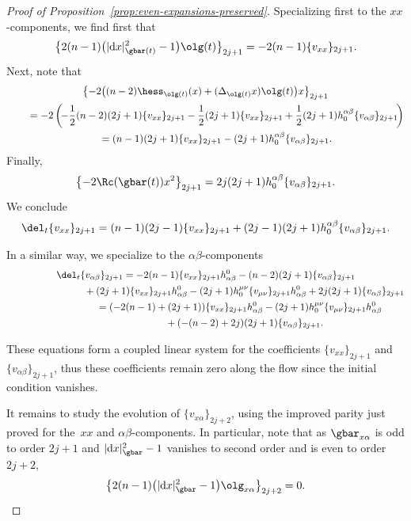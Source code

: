 \begin{proof}[Proof of Proposition~\ref{prop:even-expansions-preserved}]
Specializing first to the $xx$-components, we find first that
\[ \big\{ 2 (n-1) \big(|{\rm d}x|^2_{\gbar(t)} -1\big) \olg(t)\big\}_{2j+1} = -2(n-1) \{v_{xx}\}_{2j+1}. \]
Next, note that
\begin{gather*}
 \big\{ {-}2 \big( (n-2) \hess_{\olg(t)} (x) + (\Delta_{\olg(t)} x) \olg(t) \big) x\big\}_{2j+1} \\
\qquad{} = - 2\left(\!- \frac{1}{2} (n-2)(2j+1) \{ v_{xx} \}_{2j+1} - \frac{1}{2} (2j+1) \{ v_{xx} \}_{2j+1} + \frac{1}{2} (2j+1) h^{\alpha \beta}_0 \{v_{\alpha \beta}\}_{2j+1} \!\right) \\
 \qquad{} = (n-1) (2j+1) \{ v_{xx} \}_{2j+1} - (2j+1) h^{\alpha \beta}_0 \{v_{\alpha \beta}\}_{2j+1}.
\end{gather*}
Finally,
\begin{gather*}
\big\{ {-}2 \Rc(\gbar(t)) x^2 \big\}_{2j+1} = 2j( 2j+1) h^{\alpha \beta}_0 \{v_{\alpha \beta}\}_{2j+1}.
\end{gather*}
We conclude
\begin{gather*}
\del_t \{ v_{xx} \}_{2j+1} = (n-1)(2j-1) \{v_{xx}\}_{2j+1} + (2j-1)(2j+1) h^{\alpha \beta}_0 \{v_{\alpha \beta}\}_{2j+1}.
\end{gather*}

In a similar way, we specialize to the $\alpha \beta$-components
\begin{gather*}
 \del_t \{ v_{\alpha \beta} \}_{2j+1} = -2(n-1) \{v_{xx}\}_{2j+1} h^0_{\alpha \beta} - (n-2)(2j+1) \{ v_{\alpha \beta}\}_{2j+1} \nonumber \\
\hphantom{\del_t \{ v_{\alpha \beta} \}_{2j+1} =}{} + (2j+1) \{v_{xx}\}_{2j+1} h^0_{\alpha \beta} - (2j+1) h_0^{\mu \nu} \{v_{\mu\nu}\}_{2j+1} h^0_{\alpha \beta} + 2j(2j+1) \{v_{\alpha \beta}\}_{2j+1}\\
\hphantom{\del_t \{ v_{\alpha \beta} \}_{2j+1}}{} = (-2(n-1) + (2j+1)) \{v_{xx}\}_{2j+1} h^0_{\alpha \beta} - (2j+1) h_0^{\mu \nu} \{v_{\mu\nu}\}_{2j+1} h^0_{\alpha \beta}\\
\hphantom{\del_t \{ v_{\alpha \beta} \}_{2j+1} =}{} + ( -(n-2) + 2j )(2j+1) \{ v_{\alpha \beta}\}_{2j+1}.
\end{gather*}

These equations form a coupled linear system for the coefficients $\{v_{xx}\}_{2j+1}$ and $\{ v_{\alpha \beta} \}_{2j+1}$, thus these coefficients remain zero along the flow since the initial condition vanishes.

It remains to study the evolution of $\{v_{x \alpha}\}_{2j+2}$, using the improved parity just proved for the~$xx$ and $\alpha \beta$-components. In particular, note that as $\gbar_{x \alpha}$ is odd to order $2j+1$ and $|{\rm d}x|^2_{\gbar}-1$ vanishes to second order and is even to order~$2j+2$,
\[ \big\{ 2 (n-1) \big(|{\rm d}x|^2_{\gbar} -1\big) \olg_{x\alpha}\big\}_{2j+2} = 0. \]


\end{proof}
